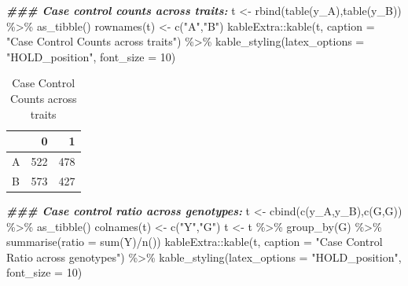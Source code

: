 \documentclass[
]{article}
\newenvironment{Shaded}{\begin{snugshade}}{\end{snugshade}}
\newcommand{\AttributeTok}[1]{\textcolor[rgb]{0.77,0.63,0.00}{#1}}
\newcommand{\DecValTok}[1]{\textcolor[rgb]{0.00,0.00,0.81}{#1}}
\newcommand{\DocumentationTok}[1]{\textcolor[rgb]{0.56,0.35,0.01}{\textbf{\textit{#1}}}}
\newcommand{\FunctionTok}[1]{\textcolor[rgb]{0.00,0.00,0.00}{#1}}
\newcommand{\NormalTok}[1]{#1}
\newcommand{\OtherTok}[1]{\textcolor[rgb]{0.56,0.35,0.01}{#1}}
\newcommand{\SpecialCharTok}[1]{\textcolor[rgb]{0.00,0.00,0.00}{#1}}
\newcommand{\StringTok}[1]{\textcolor[rgb]{0.31,0.60,0.02}{#1}}
\begin{document}
\begin{Shaded}
\begin{Highlighting}[]
\DocumentationTok{\#\#\# Case control counts across traits:}
\NormalTok{t }\OtherTok{\textless{}{-}} \FunctionTok{rbind}\NormalTok{(}\FunctionTok{table}\NormalTok{(y\_A),}\FunctionTok{table}\NormalTok{(y\_B)) }\SpecialCharTok{\%\textgreater{}\%} \FunctionTok{as\_tibble}\NormalTok{()}
\FunctionTok{rownames}\NormalTok{(t) }\OtherTok{\textless{}{-}} \FunctionTok{c}\NormalTok{(}\StringTok{"A"}\NormalTok{,}\StringTok{"B"}\NormalTok{)}
\NormalTok{kableExtra}\SpecialCharTok{::}\FunctionTok{kable}\NormalTok{(t, }\AttributeTok{caption =} \StringTok{"Case Control Counts across traits"}\NormalTok{) }\SpecialCharTok{\%\textgreater{}\%}
  \FunctionTok{kable\_styling}\NormalTok{(}\AttributeTok{latex\_options =} \StringTok{"HOLD\_position"}\NormalTok{, }\AttributeTok{font\_size =} \DecValTok{10}\NormalTok{) }
\end{Highlighting}
\end{Shaded}

\begin{table}[H]

\caption{\label{tab:simulatedData}Case Control Counts across traits}
\centering
\fontsize{10}{12}\selectfont
\begin{tabular}[t]{l|r|r}
\hline
  & 0 & 1\\
\hline
A & 522 & 478\\
\hline
B & 573 & 427\\
\hline
\end{tabular}
\end{table}

\begin{Shaded}
\begin{Highlighting}[]
\DocumentationTok{\#\#\# Case control ratio across genotypes:}
\NormalTok{t }\OtherTok{\textless{}{-}} \FunctionTok{cbind}\NormalTok{(}\FunctionTok{c}\NormalTok{(y\_A,y\_B),}\FunctionTok{c}\NormalTok{(G,G)) }\SpecialCharTok{\%\textgreater{}\%} \FunctionTok{as\_tibble}\NormalTok{()}
\FunctionTok{colnames}\NormalTok{(t) }\OtherTok{\textless{}{-}} \FunctionTok{c}\NormalTok{(}\StringTok{"Y"}\NormalTok{,}\StringTok{"G"}\NormalTok{)}
\NormalTok{t }\OtherTok{\textless{}{-}}\NormalTok{ t }\SpecialCharTok{\%\textgreater{}\%} \FunctionTok{group\_by}\NormalTok{(G) }\SpecialCharTok{\%\textgreater{}\%} \FunctionTok{summarise}\NormalTok{(}\AttributeTok{ratio =} \FunctionTok{sum}\NormalTok{(Y)}\SpecialCharTok{/}\FunctionTok{n}\NormalTok{())}
\NormalTok{kableExtra}\SpecialCharTok{::}\FunctionTok{kable}\NormalTok{(t, }\AttributeTok{caption =} \StringTok{"Case Control Ratio across genotypes"}\NormalTok{) }\SpecialCharTok{\%\textgreater{}\%}
  \FunctionTok{kable\_styling}\NormalTok{(}\AttributeTok{latex\_options =} \StringTok{"HOLD\_position"}\NormalTok{, }\AttributeTok{font\_size =} \DecValTok{10}\NormalTok{) }
\end{Highlighting}
\end{Shaded}
\end{document}
